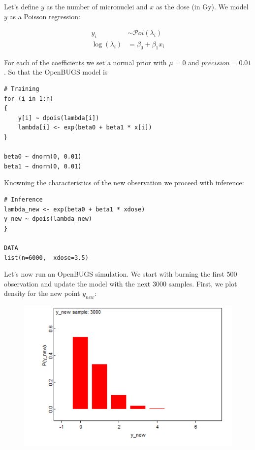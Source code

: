 \documentclass[a4 paper]{article}
\begin{document}

Let's define $y$ as the number of micronuclei
and $x$ as the dose (in Gy). We model 
$y$ as a Poisson regression:

\begin{align*}
	y_{i} & \sim\mathcal{P}oi\left(\lambda_{i}\right)\\
	\log\left(\lambda_{i}\right) & =\beta_{0}+\beta_{1}x_{i}
\end{align*}


For each of the coefficients we set a 
normal prior with $\mu=0$ and $precision=0.01$. 
So that the OpenBUGS model is 

\begin{Verbatim}
# Training
for (i in 1:n)
{
	y[i] ~ dpois(lambda[i])
	lambda[i] <- exp(beta0 + beta1 * x[i])
}

beta0 ~ dnorm(0, 0.01)
beta1 ~ dnorm(0, 0.01)
\end{Verbatim} 


Knowning the characteristics 
of the new observation we proceed with inference:
\begin{Verbatim}
# Inference
lambda_new <- exp(beta0 + beta1 * xdose)
y_new ~ dpois(lambda_new)
}

DATA
list(n=6000,  xdose=3.5)
\end{Verbatim} 

Let's now run an OpenBUGS simulation. We start 
with burning 
the first 500 observation and update the model 
with the next 3000 samples. First, we plot 
density for the new point $y_{new}$:

\begin{figure}[H]
	\includegraphics[scale=0.9]{q3}
	\centering
	\label{q3}
\end{figure}
\end{document}
